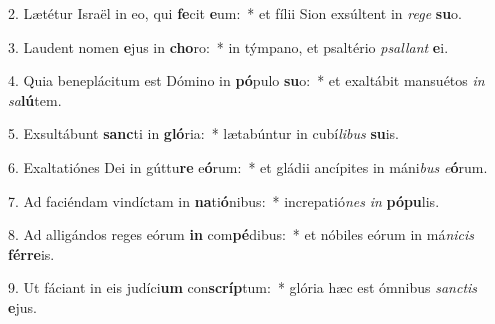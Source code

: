 2. Lætétur Israël in eo, qui \textbf{fe}cit \textbf{e}um:~*  et fílii Sion exsúltent in \textit{re}\textit{ge} \textbf{su}o.\

3. Laudent nomen \textbf{e}jus in \textbf{cho}ro:~*  in týmpano, et psaltério \textit{psal}\textit{lant} \textbf{e}i.\

4. Quia beneplácitum est Dómino in \textbf{pó}pulo \textbf{su}o:~*  et exaltábit mansuétos \textit{in} \textit{sa}\textbf{lú}tem.\

5. Exsultábunt \textbf{sanc}ti in \textbf{gló}ria:~*  lætabúntur in cubí\textit{li}\textit{bus} \textbf{su}is.\

6. Exaltatiónes Dei in gúttu\textbf{re} e\textbf{ó}rum:~*  et gládii ancípites in máni\textit{bus} \textit{e}\textbf{ó}rum.\

7. Ad faciéndam vindíctam in \textbf{na}ti\textbf{ó}nibus:~*  increpatió\textit{nes} \textit{in} \textbf{pó}\textbf{pu}lis.\

8. Ad alligándos reges eórum \textbf{in} com\textbf{pé}dibus:~*  et nóbiles eórum in má\textit{ni}\textit{cis} \textbf{fér}\textbf{re}is.\

9. Ut fáciant in eis judíci\textbf{um} con\textbf{scríp}tum:~*  glória hæc est ómnibus \textit{sanc}\textit{tis} \textbf{e}jus.\

